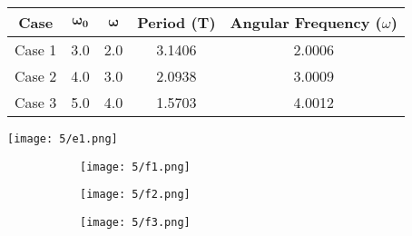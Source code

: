 \documentclass[11pt]{article}
\begin{document}
\begin{question}
	\begin{table}[h!]
		\centering
		\begin{tabular}{ccccc}
		\toprule
		\textbf{Case} & \(\boldsymbol{\omega_0}\) & \(\boldsymbol{\omega}\) & \textbf{Period (T)} & \textbf{Angular Frequency (\(\omega\))} \\
		\midrule
		Case 1 & 3.0 & 2.0 & 3.1406 & 2.0006 \\
		Case 2 & 4.0 & 3.0 & 2.0938 & 3.0009 \\
		Case 3 & 5.0 & 4.0 & 1.5703 & 4.0012 \\
		\bottomrule
		\end{tabular}
		\label{tab:oscillator_results}
		\end{table}
	
	\begin{center}
		\texttt{[image: 5/e1.png]}
	\end{center}
	
	
	
	\begin{figure}[H]
		\centering
		\begin{subfigure}{\textwidth}
			\centering
			\texttt{[image: 5/f1.png]}
			\label{fig:f1}
		\end{subfigure}
		\begin{subfigure}{\textwidth}
			\centering
			\texttt{[image: 5/f2.png]}
			\label{fig:f2}
		\end{subfigure}
		\begin{subfigure}{\textwidth}
			\centering
			\texttt{[image: 5/f3.png]}
			\label{fig:f3}
		\end{subfigure}
	\end{figure}
	

\end{question}
\end{document}
